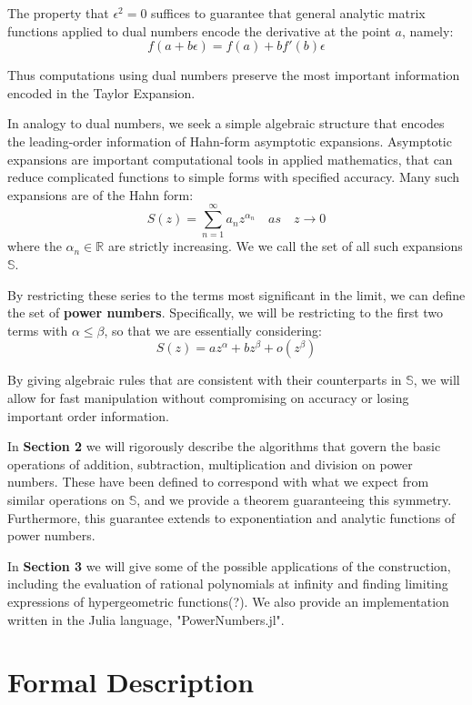 \documentclass[acmsmall]{acmart}
\begin{document}
The property that $\epsilon^2 = 0 $ suffices to guarantee that general analytic matrix functions applied to dual numbers encode the derivative at the point $a$, namely:
$$
f(a + b \epsilon) = f(a) + b f'(b) \epsilon
$$

Thus computations using dual numbers preserve the most important information  encoded in the Taylor Expansion. 

In analogy to dual numbers, we seek a simple algebraic structure that encodes the leading-order information of Hahn-form asymptotic expansions. Asymptotic expansions are important computational tools in applied mathematics, that can reduce complicated functions to simple forms with specified accuracy. Many such expansions are of the Hahn form:
\begin{equation}
S(z) = \sum_{n=1}^{\infty}a_nz^{\alpha_n} \quad as \quad z \rightarrow 0
\end{equation}
where the $\alpha_n \in \mathbb{R}$ are strictly increasing. We we call the set of all such expansions $\mathbb{S}$.

By restricting these series to the terms most significant in the limit, we can define the set of \textbf{power numbers}. Specifically, we will be restricting to the first two terms with $\alpha \leq \beta$, so that we are essentially considering:
$$S(z) = az^\alpha + bz^\beta + o(z^\beta)$$

By giving algebraic rules that are consistent with their counterparts in $\mathbb{S}$, we will allow for fast manipulation without compromising on accuracy or losing important order information. 

In \textbf{Section 2} we will rigorously describe the algorithms that govern the basic operations of addition, subtraction, multiplication and division on power numbers. These have been defined to correspond with what we expect from similar operations on $\mathbb{S}$, and we provide a theorem guaranteeing this symmetry. Furthermore, this guarantee extends to exponentiation and analytic functions of power numbers.

In \textbf{Section 3} we will give some of the possible applications of the construction, including the evaluation of rational polynomials at infinity and finding limiting expressions of hypergeometric functions(?). We also provide an implementation written in the Julia language, "PowerNumbers.jl".

\section{Formal Description}
\end{document}
